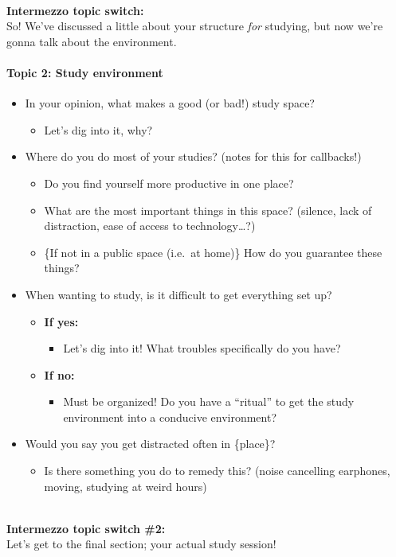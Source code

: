 \documentclass[a4paper,11pt]{article}
\begin{document}
\textbf{\\Intermezzo topic switch:} \\So! We've discussed a little about your structure \textit{for} studying, but now we're gonna talk about the environment.
\paragraph{Topic 2: Study environment}
\begin{itemize}
    \item In your opinion, what makes a good (or bad!) study space?
    \begin{itemize}
        \item Let's dig into it, why?
    \end{itemize}
    \item Where do you do most of your studies? (notes for this for callbacks!)
    \begin{itemize}
        \item Do you find yourself more productive in one place?
        \item What are the most important things in this space? (silence, lack of distraction, ease of access to technology\ldots?)
        \item \{If not in a public space (i.e.\ at home)\} How do you guarantee these things?
    \end{itemize}
    \item When wanting to study, is it difficult to get everything set up?
    \begin{itemize}
        \item \textbf{If yes:}
        \begin{itemize}
            \item Let's dig into it! What troubles specifically do you have?
        \end{itemize}
        \item \textbf{If no:}
        \begin{itemize}
            \item Must be organized! Do you have a ``ritual'' to get the study environment into a conducive environment?
        \end{itemize}
    \end{itemize}
    \item Would you say you get distracted often in \{place\}?
    \begin{itemize}
        \item Is there something you do to remedy this? (noise cancelling earphones, moving, studying at weird hours)
    \end{itemize}
\end{itemize}
\textbf{\\Intermezzo topic switch \#2:}\\Let's get to the final section; your actual study session!
\end{document}

